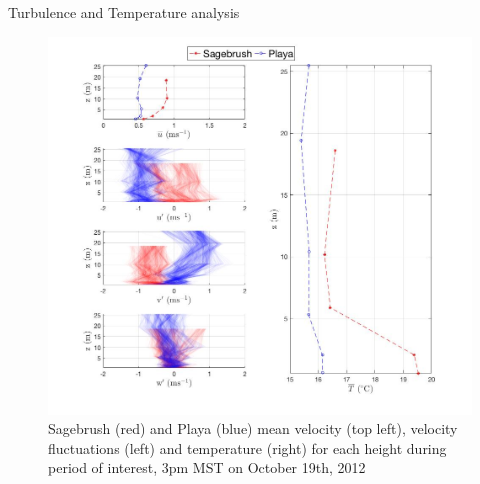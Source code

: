 \documentclass{beamer}
\begin{document}
\begin{frame}{Turbulence and Temperature analysis}
	\begin{figure}
		\centering
		\includegraphics[width=0.6\linewidth]{plots/u_T}
		\caption{Sagebrush (red) and Playa (blue) mean velocity (top left), velocity fluctuations (left) and temperature (right) for each height during period of interest, 3pm MST on October 19th, 2012}
		\label{fig:pdf}
	\end{figure}
\end{frame}
\end{document}
